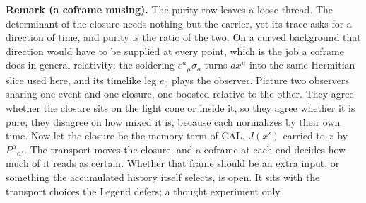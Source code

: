 \documentclass[10pt]{article}
\begin{document}
\vspace{2pt}
\begin{smallbox}
\textbf{Remark (a coframe musing).} The purity row leaves a loose thread. The determinant of the closure needs nothing but the carrier, yet its trace asks for a direction of time, and purity is the ratio of the two. On a curved background that direction would have to be supplied at every point, which is the job a coframe does in general relativity: the soldering $e^a{}_\mu\sigma_a$ turns $dx^\mu$ into the same Hermitian slice used here, and its timelike leg $e_0$ plays the observer. Picture two observers sharing one event and one closure, one boosted relative to the other. They agree whether the closure sits on the light cone or inside it, so they agree whether it is pure; they disagree on how mixed it is, because each normalizes by their own time. Now let the closure be the memory term of CAL, $J(x')$ carried to $x$ by $P^\alpha{}_{\alpha'}$. The transport moves the closure, and a coframe at each end decides how much of it reads as certain. Whether that frame should be an extra input, or something the accumulated history itself selects, is open. It sits with the transport choices the Legend defers; a thought experiment only.
\end{smallbox}
\vspace{1pt}
\end{document}
